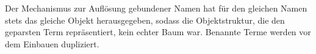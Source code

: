 \documentclass[parskip=full,11pt,openany]{scrreprt}
\begin{document}
\begin{itemize}[itemsep=3ex]
\issue{}{}{}


\issue{}{}{}

\issue{}{}{}

{Der Mechanismus zur Auflösung gebundener Namen hat für den gleichen Namen stets das gleiche Objekt
herausgegeben, sodass die Objektstruktur, die den geparsten Term repräsentiert, kein echter Baum war.}
{Benannte Terme werden vor dem Einbauen dupliziert.}

\end{itemize}
\end{document}
